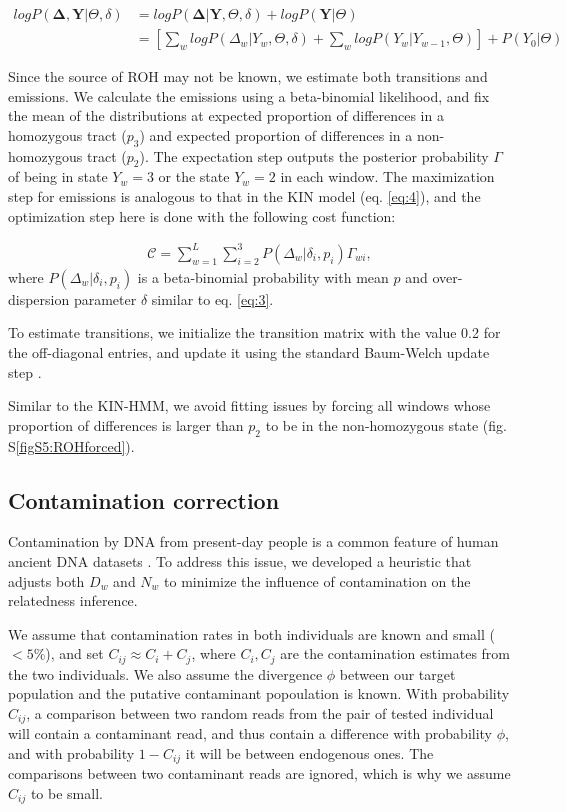 \documentclass[12pt, letterpaper]{article}
\begin{document}
\begin{align}\label{eq:10}
    log P(\mathbf{\Delta},\mathbf{Y}|\Theta,\delta) &= log P(\mathbf{\Delta}|\mathbf{Y},\Theta, \delta) + log P(\mathbf{Y}|\Theta)\nonumber\\
 &= [\sum_{w} log P(\Delta_w|Y_w, \Theta, \delta) + \sum_{w} log P(Y_w|Y_{w-1}, \Theta)] + P(Y_0| \Theta)
\end{align}

Since the source of ROH may not be known, we estimate both transitions and emissions. We calculate the emissions using a beta-binomial likelihood, and fix the mean of the distributions at expected proportion of differences in a homozygous tract ($p_3$) and expected proportion of differences in a non-homozygous tract ($p_2$). The expectation step outputs the posterior probability $\Gamma$ of being in state $Y_w=3$ or the state $Y_w=2$ in each window. The maximization step for emissions is analogous to that in the KIN model (eq. \ref{eq:4}), and the optimization step here is done with the following cost function:

\begin{align}\label{eq:11}
\mathcal{C} = \sum_{w=1}^L \sum_{i=2}^3 P(\Delta_w|\delta_{i},p_{i}) \Gamma_{wi} ,
\end{align}
where $P(\Delta_w|\delta_{i},p_{i})$ is a beta-binomial probability with mean $p$ and over-dispersion parameter $\delta$ similar to eq. \ref{eq:3}.

To estimate transitions, we initialize the transition matrix with the value 0.2 for the off-diagonal entries, and update it using the standard Baum-Welch update step \cite{baum_maximization_1970}.

Similar to the KIN-HMM, we avoid fitting issues by forcing all windows whose proportion of differences is larger than $p_2$ to be in the non-homozygous state (fig. S\ref{figS5:ROHforced}).

\subsection{Contamination correction}\label{contam}
Contamination by DNA from present-day people is a common feature of human ancient DNA datasets \cite{peyregne_present-day_2020}. To address this issue, we developed a heuristic that adjusts both $D_w$ and $N_w$ to minimize the influence of contamination on the relatedness inference.

We assume that contamination rates in both individuals are known and small ($<5\%$), and set $C_{ij} \approx C_i + C_j$, where $C_i, C_j$ are the contamination estimates from the two individuals. We also assume the divergence $\phi$ between our 
target population and the putative contaminant popoulation is known. With probability $C_{ij}$, a comparison between two random reads from the pair of tested individual will contain a contaminant read, and thus contain a difference with probability $\phi$, and with probability $1 - C_{ij}$ it will be between endogenous ones. The comparisons between two contaminant reads are ignored, which is why we assume $C_{ij}$ to be small.
\end{document}
